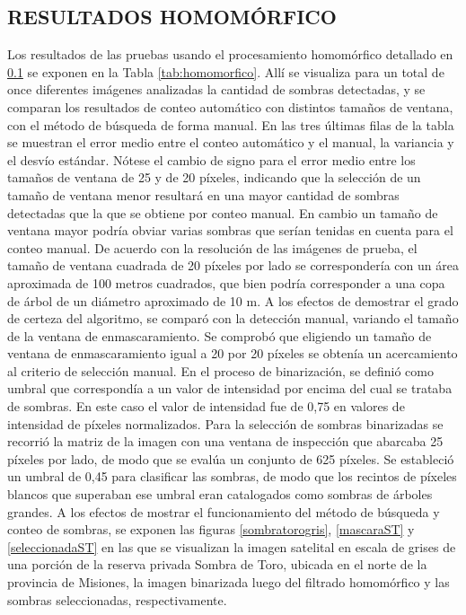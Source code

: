 \subsection{RESULTADOS HOMOMÓRFICO}

Los resultados de las pruebas usando el procesamiento homomórfico detallado en \ref{} se exponen en la Tabla \ref{tab:homomorfico}. Allí se visualiza para un total de once diferentes imágenes analizadas la cantidad de sombras detectadas, y se comparan los resultados de conteo automático con distintos tamaños de ventana, con el método de búsqueda de forma manual. En las tres últimas filas de la tabla se muestran el error medio entre el conteo automático y el manual, la variancia y el desvío estándar. Nótese el cambio de signo para el error medio entre los tamaños de ventana de 25 y de 20 píxeles, indicando que la selección de un tamaño de ventana menor resultará en una mayor cantidad de sombras detectadas que la que se obtiene por conteo manual. En cambio un tamaño de ventana mayor podría obviar varias sombras que serían tenidas en cuenta para el conteo manual. De acuerdo con la resolución de las imágenes de prueba, el tamaño de ventana cuadrada de 20 píxeles por lado se correspondería con un área aproximada de 100 metros cuadrados, que bien podría corresponder a una copa de árbol de un diámetro aproximado de 10 m.
A los efectos de demostrar el grado de certeza del algoritmo, se comparó con la detección manual, variando el tamaño de la ventana de enmascaramiento. Se comprobó que eligiendo un tamaño de ventana de enmascaramiento igual a 20 por 20 píxeles se obtenía un acercamiento al criterio de selección manual.
En el proceso de binarización, se definió como umbral que correspondía a un valor de intensidad por encima del cual se trataba de sombras. En este caso el valor de intensidad fue de 0,75 en valores de intensidad de píxeles normalizados.
Para la selección de sombras binarizadas se recorrió la matriz de la imagen con una ventana de inspección que abarcaba 25 píxeles por lado, de modo que se evalúa un conjunto de 625 píxeles. Se estableció un umbral de 0,45 para clasificar las sombras, de modo que los recintos de píxeles blancos que superaban ese umbral eran catalogados como sombras de árboles grandes.
A los efectos de mostrar el funcionamiento del método de búsqueda y conteo de sombras, se exponen las figuras \ref{sombratorogris}, \ref{mascaraST} y \ref{seleccionadaST} en las que se visualizan la imagen satelital en escala de grises de una porción de la reserva privada Sombra de Toro, ubicada en el norte de la provincia de Misiones, la imagen binarizada luego del filtrado homomórfico y las sombras seleccionadas, respectivamente.


